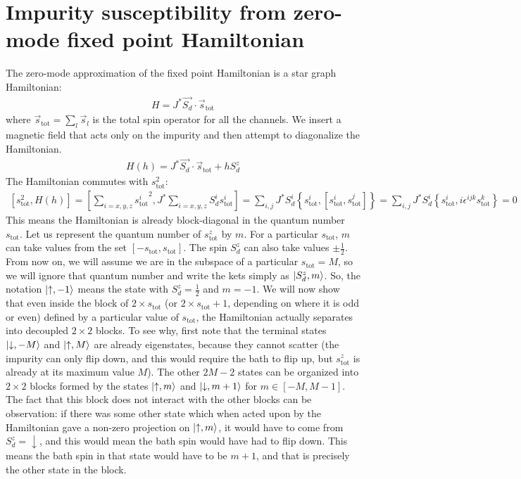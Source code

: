 \documentclass[12pt]{revtex4-2}
\begin{document}
\section{Impurity susceptibility from zero-mode fixed point Hamiltonian}
The zero-mode approximation of the fixed point Hamiltonian is a star graph Hamiltonian:
\begin{align}
	H = J^* \vec{S_d}\cdot\vec{s}_\text{tot}
\end{align}
where \(\vec s_\text{tot} = \sum_l \vec s_l\) is the total spin operator for all the channels. We insert a magnetic field that acts only on the impurity and then attempt to diagonalize the Hamiltonian.
\begin{align}
	\label{stargraph_field_hamiltonian}
	H(h) = J^* \vec{S_d}\cdot\vec{s}_\text{tot} + h S_d^z
\end{align}
The Hamiltonian commutes with \(s_\text{tot}^2\):
\begin{align}
\left[s_\text{tot}^2, H(h)\right] = \left[\sum_{i=x,y,z}{s^i_\text{tot}}^2, J^* \sum_{i=x,y,z} S_d^i s^i_\text{tot}\right] = \sum_{i,j}J^* S_d^i \left\{s_\text{tot}^i, \left[s_\text{tot}^i,s_\text{tot}^j\right]\right\} = \sum_{i,j}J^* S_d^i \left\{s_\text{tot}^i, i \epsilon^{ijk}s^k_\text{tot}\right\} = 0
\end{align}
This means the Hamiltonian is already block-diagonal in the quantum number \(s_\text{tot}\). Let us represent the quantum number of \(s_\text{tot}^z\) by \(m\). For a particular \(s_\text{tot}\), \(m\) can take values from the set \(\left[-s_\text{tot}, s_\text{tot}\right] \). The spin \(S_d^z\) can also take values \(\pm \frac{1}{2}\). From now on, we will assume we are in the subspace of a particular \(s_\text{tot} = M\), so we will ignore that quantum number and write the kets simply as \(\ket{S_d^z, m}\). So, the notation \(\ket{\uparrow,-1}\) means the state with \(S_d^z = \frac{1}{2}\) and \(m = -1\). We will now show that even inside the block of \(2\times s_\text{tot}\) (or \(2\times s_\text{tot} + 1\), depending on where it is odd or even) defined by a particular value of \(s_\text{tot}\), the Hamiltonian actually separates into decoupled \(2\times 2\) blocks. To see why, first note that the terminal states \(\ket{\downarrow, -M}\) and \(\ket{\uparrow, M}\) are already eigenstates, because they cannot scatter (the impurity can only flip down, and this would require the bath to flip up, but \(s^z_\text{tot}\) is already at its maximum value \(M\)). The other \(2M - 2\) states can be organized into \(2\times 2\) blocks formed by the states \(\ket{\uparrow, m}\) and \(\ket{\downarrow, m+1}\) for \(m \in \left[-M, M-1\right] \). The fact that this block does not interact with the other blocks can be observation: if there was some other state which when acted upon by the Hamiltonian gave a non-zero projection on \(\ket{\uparrow, m}\), it would have to come from \(S_d^z = \downarrow\), and this would mean the bath spin would have had to flip down. This means the bath spin in that state would have to be \(m+1\), and that is precisely the other state in the block. 
\end{document}
